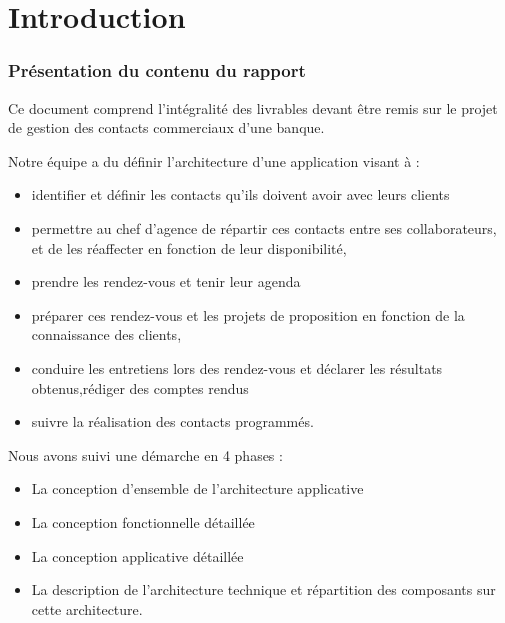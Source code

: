 




\listoftodos
\newpage

\part{Introduction}
\label{part:introduction}

\section{Présentation du contenu du rapport}
\label{sec:presentation-du-contenu-du-rapport}
Ce document comprend l'intégralité des livrables devant être remis sur le projet de gestion des contacts commerciaux d'une banque. 

Notre équipe a du définir l'architecture d'une application visant à : \\
\begin{itemize}
\item identifier et définir les contacts qu’ils doivent avoir avec leurs clients
\item permettre au chef d’agence de répartir ces contacts entre ses collaborateurs, et de les réaffecter en fonction de leur disponibilité,
\item prendre les rendez-vous et tenir leur agenda
\item préparer ces rendez-vous et les projets de proposition en fonction de la connaissance des
clients,
\item conduire les entretiens lors des rendez-vous et déclarer les résultats obtenus,rédiger des comptes rendus
\item suivre la réalisation des contacts programmés.\\

\end{itemize}


Nous avons suivi une démarche en 4 phases : 
\begin{itemize}
\item La conception d’ensemble de l’architecture applicative
\item La conception fonctionnelle détaillée
\item La conception applicative détaillée
\item La description de l’architecture technique et répartition des composants sur cette
architecture.\\
\end{itemize}

